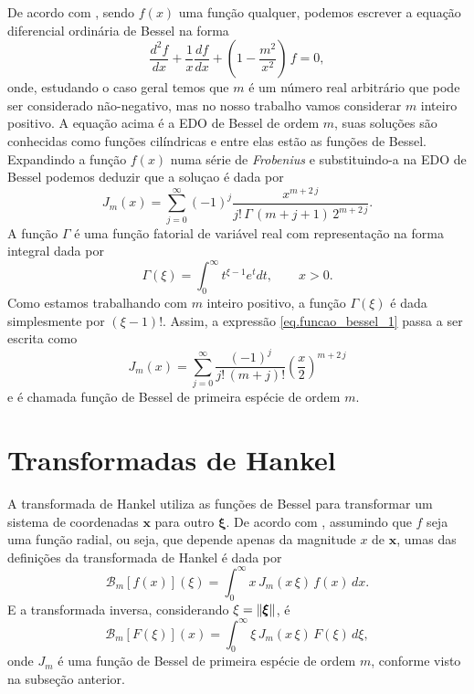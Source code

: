 De acordo com \cite{butkov_88}, sendo $f(x)$ uma fun\c{c}\~ao qualquer, podemos escrever a equa\c{c}\~ao diferencial ordin\'aria de Bessel na forma
\begin{equation}
\frac{d^2f}{dx}+\frac{1}{x}\frac{df}{dx}+\left(1-\frac{m^2}{x^2} \right)\,f=0,
\end{equation}
onde, estudando o caso geral temos que $m$ \'e um n\'umero real arbitr\'ario que pode ser considerado n\~ao-negativo, mas no nosso trabalho vamos considerar $m$ inteiro positivo. A equa\c{c}\~ao acima \'e a EDO de Bessel de ordem $m$, suas solu\c{c}\~oes s\~ao conhecidas como fun\c{c}\~oes cil\'indricas e entre elas est\~ao as fun\c{c}\~oes de Bessel. Expandindo a fun\c{c}\~ao $f(x)$ numa s\'erie de \textit{Frobenius} e substituindo-a  na EDO de Bessel podemos deduzir que a solu\c{c}ao \'e dada por
\begin{equation}\label{eq.funcao_bessel_1}
J_m(x)=\sum_{j=0}^{\infty}(-1)^j\frac{x^{m+2\,j}}{j!\,\Gamma\,(m+j+1)\,2^{m+2\,j}}.
\end{equation}
A fun\c{c}\~ao $\Gamma$ \'e uma fun\c{c}\~ao fatorial de vari\'avel real com representa\c{c}\~ao na forma integral dada por
\begin{equation*}
\Gamma(\xi)=\int_0^\infty t^{\xi-1}e^tdt,\qquad x>0.
\end{equation*}
Como estamos trabalhando com $m$ inteiro positivo, a fun\c{c}\~ao $\Gamma(\xi)$ \'e dada simplesmente por $(\xi-1)!$. Assim, a express\~ao \ref{eq.funcao_bessel_1} passa a ser escrita como
\begin{equation}\label{eq.funcao_bessel_2}
J_m(x)=\sum_{j=0}^{\infty}\frac{(-1)^j}{j!\,(m+j)!}\left(\frac{x}{2}\right)^{m+2\,j}
\end{equation}
e \'e chamada fun\c{c}\~ao de Bessel de primeira esp\'ecie de ordem $m$.

\section{Transformadas de Hankel}\label{sec.trans_hankel}
A transformada de Hankel utiliza as fun\c{c}\~oes de Bessel para transformar um sistema de coordenadas $\mathbf{x}$ para outro $\pmb{\xi}$. De acordo com \cite{baruch_2013}, assumindo que $f$ seja uma fun\c{c}\~ao radial, ou seja, que depende apenas da magnitude $x$ de $\mathbf{x}$, umas das defini\c{c}\~oes da transformada de Hankel \'e dada por
\begin{equation*}
\mathcal{B}_m[f(x)](\xi)=\int_0^\infty x\,J_m(x\,\xi)\,f(x)\,dx.
\end{equation*}
E a transformada inversa, considerando $\xi=\lVert\pmb{\xi}\rVert$, \'e
\begin{equation*}
\mathcal{B}_m[F(\xi)](x)=\int_0^\infty \xi\,J_m(x\,\xi)\,F(\xi)\,d\xi,
\end{equation*}
onde $J_m$ \'e uma fun\c{c}\~ao de Bessel de primeira esp\'ecie de ordem $m$, conforme visto na subse\c{c}\~ao anterior.










